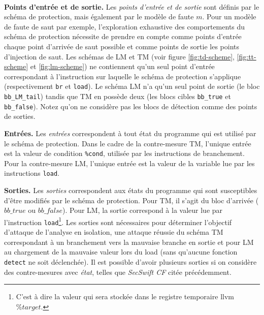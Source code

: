                 \paragraph{}
                \textbf{Points d'entrée et de sortie.} Les \textit{points d'entrée et de sortie} sont définis par le schéma de protection, mais également par le modèle de faute $m$. Pour un modèle de faute de saut par exemple, l'exploration exhaustive des comportements du schéma de protection nécessite de prendre en compte comme points d'entrée chaque point d'arrivée de saut possible et comme points de sortie les points d'injection de saut.
                Les schémas de \gls{LM} et \gls{TM} (voir figure \ref{fig:td-scheme}, \ref{fig:tt-scheme} et \ref{fig:lm-scheme}) ne contiennent qu'un seul point d'entrée correspondant à l'instruction sur laquelle le schéma de protection s'applique (respectivement \texttt{br} et \texttt{load}).
                Le schéma \gls{LM} n'a qu'un seul point de sortie (le bloc \texttt{bb\_LM\_tail}) tandis que \gls{TM} en possède deux (les blocs cibles \texttt{bb\_true} et \texttt{bb\_false}).
                Notez qu'on ne considère pas les blocs de détection comme des points de sorties.
                
                \textbf{Entrées.} Les \textit{entrées} correspondent à tout état du programme qui est utilisé par le schéma de protection. Dans le cadre de la contre-mesure \gls{TM}, l'unique entrée est la valeur de condition \texttt{\%cond}, utilisée par les instructions de branchement.
                Pour la contre-mesure \gls{LM}, l'unique entrée est la valeur de la variable lue par les instructions \texttt{load}.
                
                \textbf{Sorties.} Les \textit{sorties} correspondent aux états du programme qui sont susceptibles d'être modifiés par le schéma de protection.
                Pour \gls{TM}, il s'agit du bloc d'arrivée ($bb\_true$ ou $bb\_false$). Pour \gls{LM}, la sortie correspond à la valeur lue par l'instruction \texttt{load}\footnote{C'est à dire la valeur qui sera stockée dans le registre temporaire \gls{llvm} $\%target$.}. 
                Les sorties sont nécessaires pour déterminer l'objectif d'attaque de l'analyse en isolation, une attaque réussie du schéma \gls{TM} correspondant à un branchement vers la mauvaise branche en sortie et pour \gls{LM} au chargement de la mauvaise valeur lors du load (sans qu'aucune fonction \texttt{detect} ne soit déclenchée).
                Il est possible d'avoir plusieurs sorties si on considère des contre-mesures avec \textit{état}, telles que \textit{SecSwift CF} \cite{Ferriere/LLVM19} citée précédemment.
                
